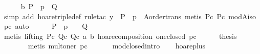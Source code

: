 \begin{isabellebody}
\ \ \ \ \isamarkupfalse%
\ b{}\ {}P{}\ {}\ p\ {}\ Q{}\isanewline
\ \ \ \ \ \ \isamarkupfalse%
\ {}simp\ add{}\ hoare{}triple{}def{}\ rule{}tac\ y\ {}\ {}P\ {}\ p{}\ \ A{}order{}trans{}\ {}metis\ P{}c\ Pc\ mod{}A{}iso\ pc{}\ auto{}\isanewline
\ \ \ \ \isamarkupfalse%
\ {}P{}\ {}\ p\ {}\ {}\ {}\ Q{}{}\isanewline
\ \ \ \ \ \ \isamarkupfalse%
\ {}metis\ {}lifting{}\ P{}c\ Q{}c\ Qc\ a\ b\ hoare{}composition\ one{}closed\ pc{}\isanewline
\ \ \ \ \isamarkupfalse%
\ {}thesis\isanewline
\ \ \ \ \ \ \isamarkupfalse%
\ {}metis\ mult{}oner\ pc{}\isanewline
\ \ \isamarkupfalse%
%
\endisatagproof
{\isafoldproof}%
%
\isadelimproof
\isanewline
%
\endisadelimproof
\isanewline
\ \ \isamarkupfalse%
\ mod{}closed{}intro{}\isanewline
\isanewline
\ \ \isamarkupfalse%
\ hoare{}plus{}\isanewline

\end{isabellebody}
